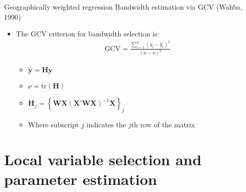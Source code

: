 \documentclass[12pt,t]{beamer}
\newcommand{\subt}[1]{{\footnotesize \color{subtitle} {#1}}}
\begin{document}
\begin{frame}{Geographically weighted regression}
\subt{Bandwidth estimation via GCV (Wahba, 1990)}

\bigskip
\begin{itemize}
    \item The GCV criterion for bandwidth selection is:
    \begin{align*}
      \text{GCV} = \frac{\sum_{i=1}^n \left(y_i - \hat{y}_i\right)^2}{(n-\nu)^2}
    \end{align*}
    \begin{itemize}
        \item $\hat{\bm{y}} = \bm{H}\bm{y}$
        \item $\nu = \text{tr}(\bm{H})$
        \item $\bm{H}_j = \left\{ \bm{W} \bm{X} (\bm{X}'\bm{W}\bm{X})^{-1} \bm{X} \right\}_j$
        \item Where subscript $j$ indicates the $j$th row of the matrix
    \end{itemize}
\end{itemize}

\end{frame}






\section{Local variable selection and parameter estimation}
\end{document}
